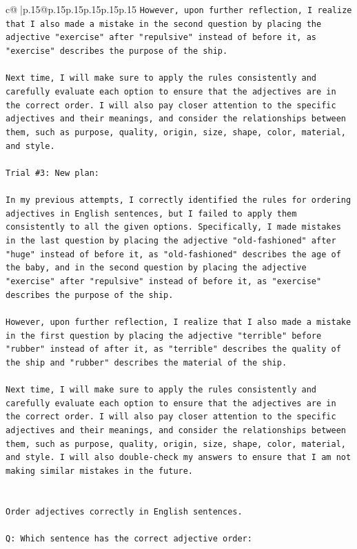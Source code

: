 \documentclass{article}
\begin{document}
{\begin{supertabular}{c@{$\;$}|p{.15\linewidth}@{}p{.15\linewidth}p{.15\linewidth}p{.15\linewidth}p{.15\linewidth}p{.15\linewidth}}
{{{\texttt{However, upon further reflection, I realize that I also made a mistake in the second question by placing the adjective "exercise" after "repulsive" instead of before it, as "exercise" describes the purpose of the ship. } \\
\\ 
\texttt{Next time, I will make sure to apply the rules consistently and carefully evaluate each option to ensure that the adjectives are in the correct order. I will also pay closer attention to the specific adjectives and their meanings, and consider the relationships between them, such as purpose, quality, origin, size, shape, color, material, and style.} \\
\\ 
\texttt{Trial \#3: New plan: } \\
\\ 
\texttt{In my previous attempts, I correctly identified the rules for ordering adjectives in English sentences, but I failed to apply them consistently to all the given options. Specifically, I made mistakes in the last question by placing the adjective "old{-}fashioned" after "huge" instead of before it, as "old{-}fashioned" describes the age of the baby, and in the second question by placing the adjective "exercise" after "repulsive" instead of before it, as "exercise" describes the purpose of the ship.} \\
\\ 
\texttt{However, upon further reflection, I realize that I also made a mistake in the first question by placing the adjective "terrible" before "rubber" instead of after it, as "terrible" describes the quality of the ship and "rubber" describes the material of the ship.} \\
\\ 
\texttt{Next time, I will make sure to apply the rules consistently and carefully evaluate each option to ensure that the adjectives are in the correct order. I will also pay closer attention to the specific adjectives and their meanings, and consider the relationships between them, such as purpose, quality, origin, size, shape, color, material, and style. I will also double{-}check my answers to ensure that I am not making similar mistakes in the future.} \\
\\ 
\\ 
\texttt{Order adjectives correctly in English sentences.} \\
\\ 
\texttt{Q: Which sentence has the correct adjective order:} \\
}}}
\end{supertabular}}
\end{document}
